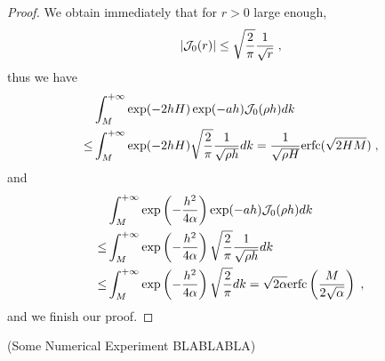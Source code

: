 \begin{proof}
We obtain immediately that for $r>0$ large enough,     
\begin{equation*}
   \left\lvert\mathcal{J}_0(r)\right\rvert\leq \sqrt{\frac{2}{\pi}} \frac{1}{\sqrt{r}}\;, 
\end{equation*}
thus we have 
\begin{align*}
   & \int_M^{+\infty}  \exp(-2hH)\exp(-ah) \mathcal{J}_0(\rho h)d k \\
\leq & \int_M^{+\infty}  \exp(-2hH)\sqrt{\frac{2}{\pi}} \frac{1}{\sqrt{\rho h}} d k=\frac{1}{\sqrt{\rho H}}\mathrm{erfc}(\sqrt{2HM})\;,
\end{align*}
and 
\begin{align*}
  &\int_M^{+\infty}  \exp\left(-\frac{h^2}{4\alpha}\right)  \exp(-ah) \mathcal{J}_0(\rho h)d k \\
  \leq &\int_M^{+\infty} \exp\left(-\frac{h^2}{4\alpha}\right)\sqrt{\frac{2}{\pi}} \frac{1}{\sqrt{\rho h}} d k\\ 
  \leq &\int_M^{+\infty} \exp\left(-\frac{h^2}{4\alpha}\right)\sqrt{\frac{2}{\pi}} d k=\sqrt{2\alpha} \mathrm{erfc}\left(\frac{M}{2\sqrt{\alpha}}\right)\;,
\end{align*}
and we finish our proof.
\end{proof}
(Some Numerical Experiment BLABLABLA)

